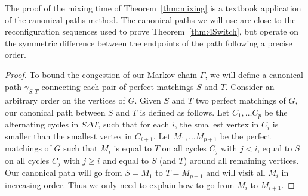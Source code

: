 \documentclass[11pt,a4paper]{article}
\theoremstyle{definition}
\begin{document}
The proof of the mixing time of Theorem~\ref{thm:mixing} is a textbook application of
the canonical paths method. The canonical paths we will use are close to the
reconfiguration sequences used to prove Theorem~\ref{thm:4Switch}, but operate on the
symmetric difference between the endpoints of the path following a precise
order.
\begin{proof}

  To bound the congestion of our Markov chain $\Gamma$, we will define a
  canonical path $\gamma_{S,T}$ connecting each pair of perfect matchings $S$
  and $T$. Consider an arbitrary order on the vertices of $G$. Given $S$ and $T$
  two perfect matchings of $G$, our canonical path between $S$ and $T$ is
  defined as follows. Let $C_1, \dots C_p$ be the alternating cycles in
  $S \Delta T$, such that for each $i$, the smallest vertex in $C_i$ is smaller
  than the smallest vertex in $C_{i+1}$. Let $M_1, \dots M_{p+1}$ be the perfect
  matchings of $G$ such that $M_i$ is equal to $T$ on all cycles $C_j$ with
  $j < i$, equal to $S$ on all cycles $C_j$ with $j \ge i$ and equal to $S$ (and
  $T$) around all remaining vertices. Our canonical path will go from $S=M_1$ to
  $T=M_{p+1}$ and will visit all $M_i$ in increasing order. Thus we only need to
  explain how to go from $M_i$ to $M_{i+1}$.


\end{proof}
\end{document}
